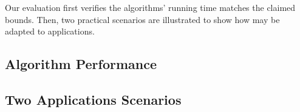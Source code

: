 Our evaluation first verifies the algorithms' running time matches 
the claimed bounds. Then, two practical scenarios are illustrated 
to show how \opg may be adapted to applications. 

\vspace*{-1mm}
\subsection{Algorithm Performance}
\vspace*{-1mm}

\subsection{Two Applications Scenarios}



